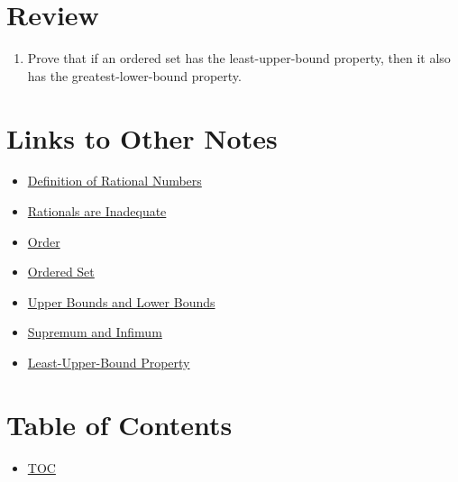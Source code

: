 \section*{Review}
\begin{enumerate}
  \item Prove that if an ordered set has the least-upper-bound property, then it also has the greatest-lower-bound property. 
\end{enumerate}


\section*{Links to Other Notes}
\begin{itemize}
  \item \hyperref[202501131947]{Definition of Rational Numbers}
  \item \hyperref[202501132004]{Rationals are Inadequate}
  \item \hyperref[202501141228]{Order}
  \item \hyperref[202501141241]{Ordered Set}
  \item \hyperref[202501141250]{Upper Bounds and Lower Bounds}
  \item \hyperref[202501141546]{Supremum and Infimum}
  \item \hyperref[202501141632]{Least-Upper-Bound Property}
\end{itemize}

\section*{Table of Contents}

\begin{itemize}
  \item \hyperref[toc]{TOC}
\end{itemize}

